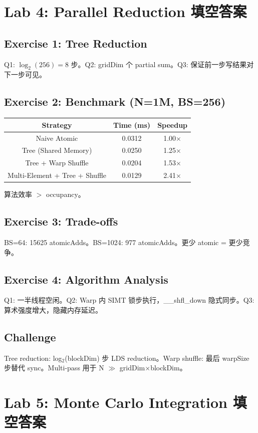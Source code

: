\documentclass[a4paper]{article}
\begin{document}
\newpage
\section{Lab 4: Parallel Reduction 填空答案}

\subsection*{Exercise 1: Tree Reduction}
Q1: $\log_2(256) = 8$ 步。Q2: gridDim 个 partial sum。Q3: 保证前一步写结果对下一步可见。

\subsection*{Exercise 2: Benchmark (N=1M, BS=256)}
\begin{tabular}{|c|c|c|}
\hline
Strategy & Time (ms) & Speedup \\
\hline
Naive Atomic & 0.0312 & 1.00$\times$ \\
Tree (Shared Memory) & 0.0250 & 1.25$\times$ \\
Tree + Warp Shuffle & 0.0204 & 1.53$\times$ \\
Multi-Element + Tree + Shuffle & 0.0129 & 2.41$\times$ \\
\hline
\end{tabular}
算法效率 $>$ occupancy。

\subsection*{Exercise 3: Trade-offs}
BS=64: 15625 atomicAdds。BS=1024: 977 atomicAdds。更少 atomic = 更少竞争。

\subsection*{Exercise 4: Algorithm Analysis}
Q1: 一半线程空闲。Q2: Warp 内 SIMT 锁步执行，\_\_shfl\_down 隐式同步。Q3: 算术强度增大，隐藏内存延迟。

\subsection*{Challenge}
Tree reduction: log$_2$(blockDim) 步 LDS reduction。Warp shuffle: 最后 warpSize 步替代 sync。Multi-pass 用于 N $\gg$ gridDim$\times$blockDim。

\newpage
\section{Lab 5: Monte Carlo Integration 填空答案}
\end{document}
